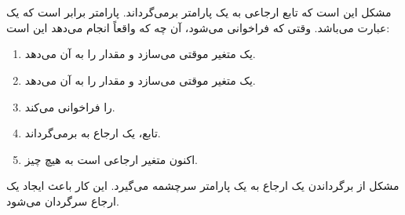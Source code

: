 \section{}
\paragraph{}\label{answer:22}
مشکل این است که تابع  ارجاعی به یک پارامتر برمی‌گرداند. پارامتر برابر  است که یک عبارت می‌باشد. وقتی که  فراخوانی می‌شود، آن چه که  واقعاً انجام می‌دهد این است:
\begin{enumerate}
    \item یک متغیر موقتی می‌سازد  و مقدار  را به آن می‌دهد.
    \item یک متغیر موقتی می‌سازد  و مقدار  را به آن می‌دهد.
    \item {} را فراخوانی می‌کند.
    \item تابع، یک ارجاع به  برمی‌گرداند.
    \item اکنون متغیر  ارجاعی است به هیچ چیز.
\end{enumerate}

مشکل از برگرداندن یک ارجاع به یک پارامتر سرچشمه می‌گیرد. این کار باعث ایجاد یک ارجاع سرگردان می‌شود.
